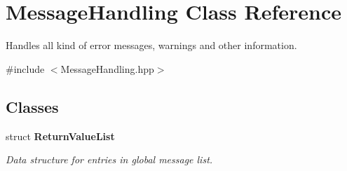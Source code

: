 \section{MessageHandling Class Reference}
\label{classMessageHandling}


Handles all kind of error messages, warnings and other information.  




{\ttfamily \#include $<$MessageHandling.hpp$>$}

\subsection*{Classes}
\begin{DoxyCompactItemize}
\item 
struct {\bf ReturnValueList}
\begin{DoxyCompactList}\small\item\em Data structure for entries in global message list. \end{DoxyCompactList}\end{DoxyCompactItemize}
